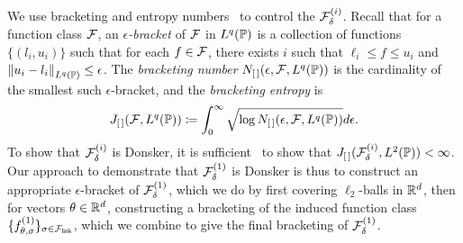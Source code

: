 We use bracketing and entropy numbers~\cite{VanDerVaartWe96} to control the
$\mc{F}_\delta^{(i)}$. Recall that for a function class $\mc{F}$, an
\emph{$\epsilon$-bracket} of $\mc{F}$ in $L^q(\P)$ is a collection of
functions $\{(l_i, u_i)\}$ such that for each $f \in \mc{F}$, there exists
$i$ such that $\ell_i \le f \le u_i$ and $\norm{u_i - l_i}_{L^q(\P)} \le
\epsilon$. The \emph{bracketing number} $N_{[\,]}(\epsilon, \mc{F}, L^q(\P))$
is the cardinality of the smallest such $\epsilon$-bracket, and
the \emph{bracketing entropy} is
\begin{align*}
	J_{[\,]}(\mc{F}, L^q(\P))
	\defeq \int_0^\infty
	\sqrt{\log N_{[\,]}(\epsilon , \mathcal{F}, L^q(\Prb))} d \epsilon.
\end{align*}
To show that $\mc{F}_\delta^{(i)}$ is Donsker, it is
sufficient~\cite[Ch.~2.5.2]{VanDerVaartWe96} to show that
$J_{[\,]}(\mc{F}_\delta^{(i)}, L^2(\P)) < \infty$.
%
Our approach to demonstrate that $\mc{F}_\delta^{(1)}$ is Donsker is thus to
construct an appropriate $\epsilon$-bracket of $\mc{F}_\delta^{(1)}$, which
we do
by first covering $\ell_2$-balls in $\R^d$, then for vectors
$\theta \in \R^d$, constructing a bracketing of the induced function class
$\{f_{\theta,\sigma}^{(1)}\}_{\sigma \in \Flink}$, which we combine
to give the final bracketing of $\mc{F}_\delta^{(1)}$.

